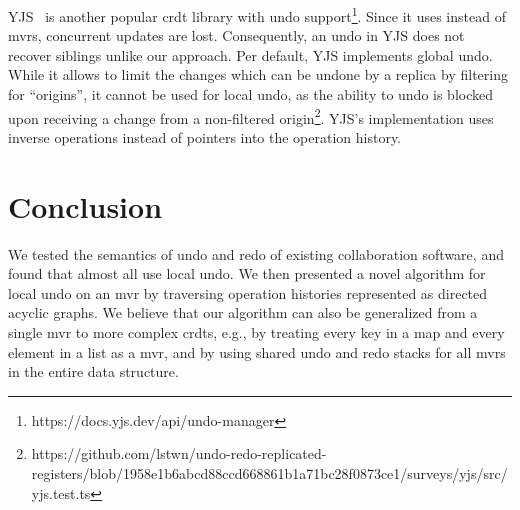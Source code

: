 \documentclass[sigplan,natbib=false,review]{acmart}
\begin{document}
YJS~\cite{yjspaper,yjsproject} is another popular \gls{crdt} library with
undo support\footnote{https://docs.yjs.dev/api/undo-manager}.
Since it uses  instead of \glspl{mvr}, concurrent updates are lost.
Consequently, an undo in YJS does not recover siblings unlike our approach.
Per default, YJS implements global undo.
While it allows to limit the changes which can be undone by a replica
by filtering for ``origins'',
it cannot be used for local undo, as the ability to undo is blocked
upon receiving a change from a non-filtered
origin\footnote{https://github.com/lstwn/undo-redo-replicated-registers/blob/1958e1b6abcd88ccd668861b1a71bc28f0873ce1/surveys/yjs/src/yjs.test.ts}.
YJS's implementation uses inverse operations instead of pointers into the
operation history.

\section{Conclusion}\label{sec:conclusion}

We tested the semantics of undo and redo of existing collaboration software,
and found that almost all use local undo.
We then presented a novel algorithm for local undo on an \gls*{mvr}
by traversing operation histories represented as directed acyclic graphs.
We believe that our algorithm can also be generalized from a single \gls{mvr}
to more complex \glspl{crdt}, e.g., by treating every key in a map and
every element in a list as a \gls{mvr}, and by using shared
undo and redo stacks for all \glspl{mvr} in the entire data structure.

\printbibliography

\end{document}
